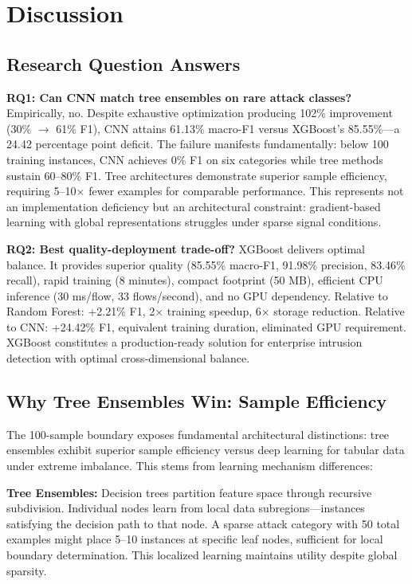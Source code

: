 \documentclass[10pt,twocolumn]{article}
\begin{document}
\section{Discussion}

\subsection{Research Question Answers}

\textbf{RQ1: Can CNN match tree ensembles on rare attack classes?} Empirically, no. Despite exhaustive optimization producing 102\% improvement (30\% $\rightarrow$ 61\% F1), CNN attains 61.13\% macro-F1 versus XGBoost's 85.55\%—a 24.42 percentage point deficit. The failure manifests fundamentally: below 100 training instances, CNN achieves 0\% F1 on six categories while tree methods sustain 60--80\% F1. Tree architectures demonstrate superior sample efficiency, requiring 5--10× fewer examples for comparable performance. This represents not an implementation deficiency but an architectural constraint: gradient-based learning with global representations struggles under sparse signal conditions.

\textbf{RQ2: Best quality-deployment trade-off?} XGBoost delivers optimal balance. It provides superior quality (85.55\% macro-F1, 91.98\% precision, 83.46\% recall), rapid training (8 minutes), compact footprint (50 MB), efficient CPU inference (30 ms/flow, 33 flows/second), and no GPU dependency. Relative to Random Forest: +2.21\% F1, 2× training speedup, 6× storage reduction. Relative to CNN: +24.42\% F1, equivalent training duration, eliminated GPU requirement. XGBoost constitutes a production-ready solution for enterprise intrusion detection with optimal cross-dimensional balance.

\subsection{Why Tree Ensembles Win: Sample Efficiency}

The 100-sample boundary exposes fundamental architectural distinctions: tree ensembles exhibit superior sample efficiency versus deep learning for tabular data under extreme imbalance. This stems from learning mechanism differences:

\textbf{Tree Ensembles:} Decision trees partition feature space through recursive subdivision. Individual nodes learn from local data subregions—instances satisfying the decision path to that node. A sparse attack category with 50 total examples might place 5--10 instances at specific leaf nodes, sufficient for local boundary determination. This localized learning maintains utility despite global sparsity.
\end{document}
